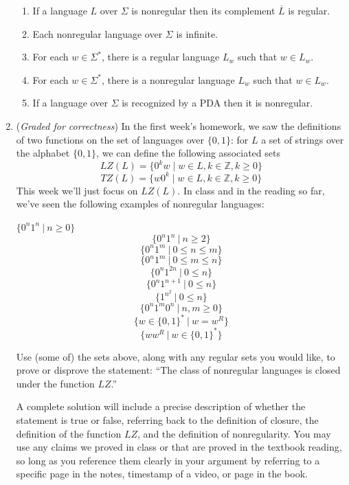 \begin{enumerate}
\begin{enumerate}
\item If a language $L$ over $\Sigma$ is nonregular then its complement $\overline{L}$ is regular.
\item Each nonregular language over $\Sigma$ is infinite.
\item For each $w \in \Sigma^*$, there is a regular language $L_{w}$ such that $w \in L_{w}$.
\item For each $w \in \Sigma^*$, there is a nonregular language $L_{w}$ such that $w \in L_{w}$.
\item If a language over $\Sigma$ is recognized by a PDA then it is nonregular.
\end{enumerate}

\item ({\it Graded for correctness}) 
In the first week's homework, 
we saw the definitions of two functions on the set of languages over $\{0,1\}$:
for $L$ a set of strings over the alphabet $\{0,1\}$, we can define the following associated sets
\[
LZ(L) = \{ 0^k w \mid w \in L, k \in \mathbb{Z}, k \geq 0 \}
\]
\[
TZ(L) = \{ w 0^k \mid w \in L, k \in \mathbb{Z}, k \geq 0 \}
\]
This week we'll just focus on $LZ(L)$. 
In class and in the reading so far, we've seen the following examples of nonregular languages:
\begin{multicols}{3}
\begin{center}
$\{ 0^n 1^n ~|~ n \geq 0 \}$
$$\{ 0^n 1^n ~|~ n \geq 2 \}$$
$$\{ 0^n 1^m ~|~  0 \leq n \leq m \}$$
$$\{ 0^n 1^m ~|~ 0 \leq m \leq n \}$$
$$\{ 0^n 1^{2n} ~|~ 0 \leq n \}$$
$$\{ 0^n 1^{n+1} ~|~ 0 \leq n \}$$
$$\{ 1^{n^2} ~|~ 0 \leq n \}$$
$$\{ 0^n 1^m 0^n ~|~n,m \geq 0\}$$
$$\{ w \in \{0,1\}^* ~|~w = w^R\}$$
$$\{ w w^R ~|~ w \in \{0,1\}^*\}$$
\end{center}
\end{multicols}

Use (some of) the sets above, along with any regular sets you would like, to 
prove or disprove the statement: ``The class of nonregular languages
is closed under the function $LZ$.''

A complete solution will include a precise description of whether
the statement is true or false, referring back to the definition of closure, 
the definition of the function $LZ$, and the definition of nonregularity.
You may use any claims we proved in class or that are proved in the textbook reading,
so long as you reference them clearly in your argument by referring to a specific page 
in the notes, timestamp of a video, or page in the book.


\end{enumerate}

